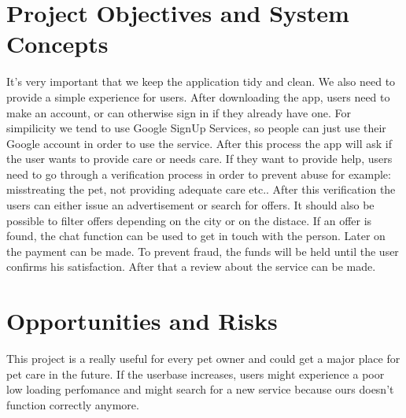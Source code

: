 \documentclass[12pt]{article}
\theoremstyle{definition}
\newenvironment{explanation}{%
}{}
\begin{document}
\section{Project Objectives and System Concepts}
\begin{explanation}
It's very important that we keep the application tidy and clean. We also need to provide a simple experience for users.
\newline
After downloading the app, users need to make an account, or can otherwise sign in if they already have one.
\newline
For simpilicity we tend to use Google SignUp Services, so people can just use their Google account in order to use the service.
\newline
After this process the app will ask if the user wants to provide care or needs care.
\newline
If they want to provide help, users need to go through a verification process in order to prevent abuse for example: misstreating the pet, not providing adequate care etc..
\newline
After this verification the users can either issue an advertisement or search for offers. It should also be possible to filter offers depending on the city or on the distace.
\newline
If an offer is found, the chat function can be used to get in touch with the person. Later on the payment can be made.
\newline
To prevent fraud, the funds will be held until the user confirms his satisfaction.
\newline
After that a review about the service can be made.
\end{explanation}

\section{Opportunities and Risks}
\begin{explanation}
This project is a really useful for every pet owner and could get a major place for pet care in the future.
\newline
If the userbase increases, users might experience a poor low loading perfomance and might search for a new service because ours doesn't function correctly anymore.
\end{explanation}
\pagebreak
\end{document}
